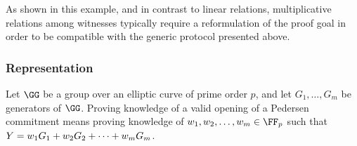 \documentclass[11pt]{article}
\begin{document}
As shown in this example, and in contrast to linear relations, multiplicative relations among witnesses typically require a reformulation of the proof goal in order to be compatible with the generic protocol presented above.


\subsubsection{Representation}\label{sec:instantiations:representation}
Let $\GG$ be a group over an elliptic curve of prime order $p$, and let $G_1, \dots, G_m$ be generators of $\GG$.
Proving knowledge of a valid opening of a Pedersen commitment means proving knowledge of $\witness_1,\witness_2, \dots, \witness_m\in\FF_p$ such that $Y=w_1G_1 + w_2G_2 + \dots + w_m G_m$.
\end{document}
